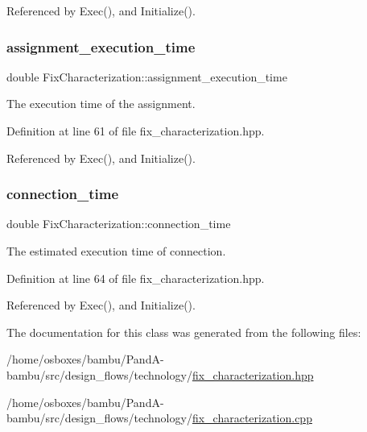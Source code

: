 Referenced by Exec(), and Initialize().

\mbox{\label{classFixCharacterization_a72929764ff35242fc8b54f5bb18c81d7}} 
\subsubsection{\texorpdfstring{assignment\+\_\+execution\+\_\+time}{assignment\_execution\_time}}
{\footnotesize\ttfamily double Fix\+Characterization\+::assignment\+\_\+execution\+\_\+time\hspace{0.3cm}{\ttfamily [protected]}}



The execution time of the assignment. 



Definition at line 61 of file fix\+\_\+characterization.\+hpp.



Referenced by Exec(), and Initialize().

\mbox{\label{classFixCharacterization_a94ef66e7a1a9d5a38f53b162534898a1}} 
\subsubsection{\texorpdfstring{connection\+\_\+time}{connection\_time}}
{\footnotesize\ttfamily double Fix\+Characterization\+::connection\+\_\+time\hspace{0.3cm}{\ttfamily [protected]}}



The estimated execution time of connection. 



Definition at line 64 of file fix\+\_\+characterization.\+hpp.



Referenced by Exec(), and Initialize().



The documentation for this class was generated from the following files\+:\begin{DoxyCompactItemize}
\item 
/home/osboxes/bambu/\+Pand\+A-\/bambu/src/design\+\_\+flows/technology/\hyperlink{fix__characterization_8hpp}{fix\+\_\+characterization.\+hpp}\item 
/home/osboxes/bambu/\+Pand\+A-\/bambu/src/design\+\_\+flows/technology/\hyperlink{fix__characterization_8cpp}{fix\+\_\+characterization.\+cpp}\end{DoxyCompactItemize}

